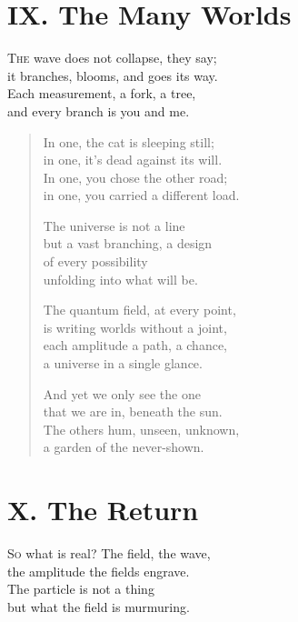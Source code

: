 \documentclass[11pt]{book}
\begin{document}
\section*{IX. The Many Worlds}
\lettrine{T}{he} wave does not collapse, they say;\\
it branches, blooms, and goes its way.\\
Each measurement, a fork, a tree,\\
and every branch is you and me.

\begin{verse}
In one, the cat is sleeping still;\\
in one, it's dead against its will.\\
In one, you chose the other road;\\
in one, you carried a different load.

The universe is not a line\\
but a vast branching, a design\\
of every possibility\\
unfolding into what will be.

The quantum field, at every point,\\
is writing worlds without a joint,\\
each amplitude a path, a chance,\\
a universe in a single glance.

And yet we only see the one\\
that we are in, beneath the sun.\\
The others hum, unseen, unknown,\\
a garden of the never-shown.
\end{verse}

\section*{X. The Return}
\lettrine{S}{o} what is real? The field, the wave,\\
the amplitude the fields engrave.\\
The particle is not a thing\\
but what the field is murmuring.
\end{document}
